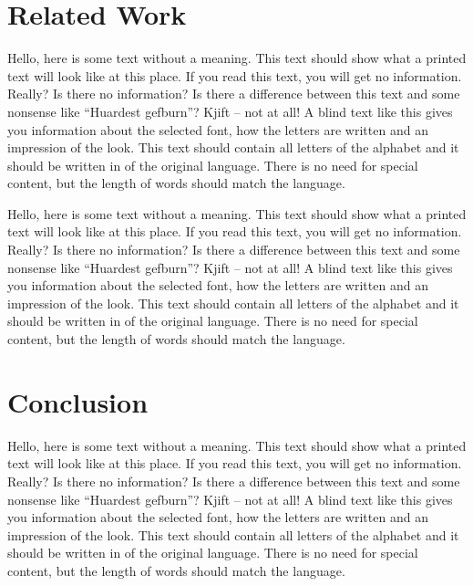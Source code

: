 \documentclass[%
  english,%
  todotools=true,%
  trtype=singlearticle%
]{hpitr}
\begin{document}
\section{Related Work}
\label{sec:related-work}

Hello, here is some text without a meaning. This text should show
what a printed text will look like at this place. If you read this
text, you will get no information. Really? Is there no information?
Is there a difference between this text and some nonsense like
“Huardest gefburn”? Kjift – not at all! A blind text like this gives
you information about the selected font, how the letters are written
and an impression of the look. This text should contain all letters
of the alphabet and it should be written in of the original
language. There is no need for special content, but the length of
words should match the language.

Hello, here is some text without a meaning. This text should show
what a printed text will look like at this place. If you read this
text, you will get no information. Really? Is there no information?
Is there a difference between this text and some nonsense like
“Huardest gefburn”? Kjift – not at all! A blind text like this gives
you information about the selected font, how the letters are written
and an impression of the look. This text should contain all letters
of the alphabet and it should be written in of the original
language. There is no need for special content, but the length of
words should match the language.

\section{Conclusion}
\label{sec:conclusion}

Hello, here is some text without a meaning. This text should show
what a printed text will look like at this place. If you read this
text, you will get no information. Really? Is there no information?
Is there a difference between this text and some nonsense like
“Huardest gefburn”? Kjift – not at all! A blind text like this gives
you information about the selected font, how the letters are written
and an impression of the look. This text should contain all letters
of the alphabet and it should be written in of the original
language. There is no need for special content, but the length of
words should match the language.
\end{document}
